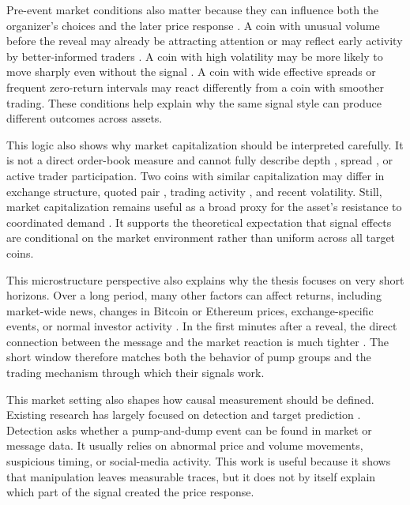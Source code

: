 Pre-event market conditions also matter because they can influence both the organizer's choices and the later price response \cite{charfeddine2024drives, hu2023sequence}. A coin with unusual volume before the reveal may already be attracting attention or may reflect early activity by better-informed traders \cite{li2021cryptocurrency}. A coin with high volatility may be more likely to move sharply even without the signal \cite{parkinson1980extreme}. A coin with wide effective spreads \cite{roll1984simple} or frequent zero-return intervals may react differently from a coin with smoother trading. These conditions help explain why the same signal style can produce different outcomes across assets.

This logic also shows why market capitalization should be interpreted carefully. It is not a direct order-book measure and cannot fully describe depth \cite{amihud2002illiquidity}, spread \cite{roll1984simple}, or active trader participation. Two coins with similar capitalization may differ in exchange structure, quoted pair \cite{makarov2020trading}, trading activity \cite{wei2018liquidity}, and recent volatility. Still, market capitalization remains useful as a broad proxy for the asset's resistance to coordinated demand \cite{charfeddine2024drives}. It supports the theoretical expectation that signal effects are conditional on the market environment rather than uniform across all target coins.

This microstructure perspective also explains why the thesis focuses on very short horizons. Over a long period, many other factors can affect returns, including market-wide news, changes in Bitcoin or Ethereum prices, exchange-specific events, or normal investor activity \cite{mackinlay1997event}. In the first minutes after a reveal, the direct connection between the message and the market reaction is much tighter \cite{xu2019anatomy, li2021cryptocurrency}. The short window therefore matches both the behavior of pump groups and the trading mechanism through which their signals work.

This market setting also shapes how causal measurement should be defined. Existing research has largely focused on detection and target prediction \cite{kamps2018pump, victor2019cryptocurrency, lamorgia2020pump, hu2023sequence}. Detection asks whether a pump-and-dump event can be found in market or message data. It usually relies on abnormal price and volume movements, suspicious timing, or social-media activity. This work is useful because it shows that manipulation leaves measurable traces, but it does not by itself explain which part of the signal created the price response.

